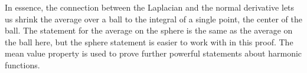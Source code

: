 \documentclass[titlepage]{article}
\renewcommand{\;}{\:\:\:} %
\newcommand{\f}[2]{\frac{#1}{#2}} %
\theoremstyle{definition}
\theoremstyle{theorem}
\newtheorem*{theorem}{Theorem}
\theoremstyle{remark}
\theoremstyle{lemma}
\begin{document}
In essence, the connection between the Laplacian and the normal derivative lets us shrink the average over a ball to the integral of a single point, the center of the ball. The statement for the average on the sphere is the same as the average on the ball here, but the sphere statement is easier to work with in this proof. The mean value property is used to prove further powerful statements about harmonic functions.










\end{document}

